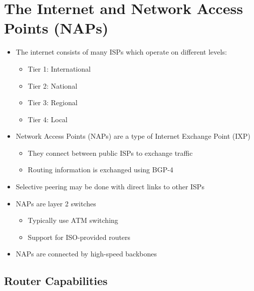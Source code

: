 \section*{The Internet and Network Access Points (NAPs)}

\begin{itemize}
  \item The internet consists of many ISPs which operate on different levels:
  \begin{itemize}
    \item Tier 1: International
    \item Tier 2: National
    \item Tier 3: Regional
    \item Tier 4: Local
  \end{itemize}
  \item Network Access Points (NAPs) are a type of Internet Exchange Point (IXP)
  \begin{itemize}
    \item They connect between public ISPs to exchange traffic
    \item Routing information is exchanged using BGP-4
  \end{itemize}
  \item Selective peering may be done with direct links to other ISPs
  \item NAPs are layer 2 switches
  \begin{itemize}
    \item Typically use ATM switching
    \item Support for ISO-provided routers
  \end{itemize}
  \item NAPs are connected by high-speed backbones
\end{itemize}

\subsection*{Router Capabilities}

